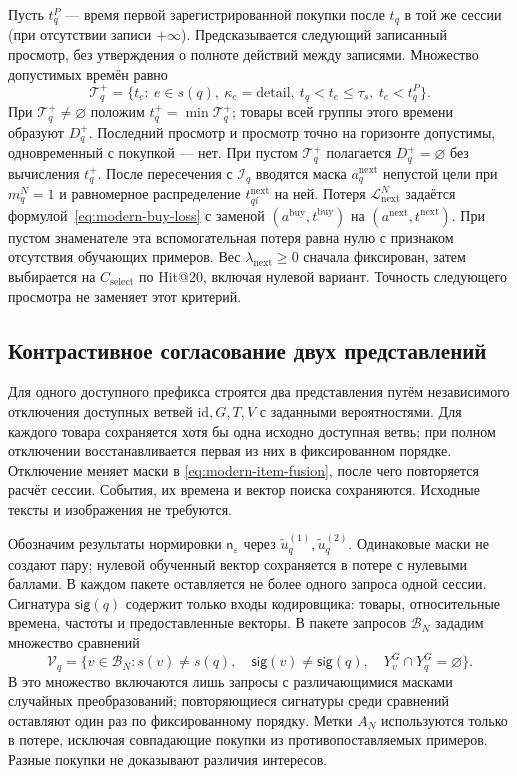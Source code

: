 \documentclass[12pt,a4paper]{article}
\newcommand{\eps}{\varepsilon}
\theoremstyle{plainru}
\begin{document}
Пусть $t_q^P$ --- время первой зарегистрированной покупки после $t_q$
в той же сессии (при отсутствии записи $+\infty$).
Предсказывается следующий записанный просмотр, без утверждения
о полноте действий между записями. Множество допустимых времён равно
\begin{equation}\label{eq:modern-next-time}
\mathcal T_q^+=\{t_e:\ e\in s(q),\ \kappa_e=\mathrm{detail},\
t_q<t_e\le\tau_s,\ t_e<t_q^P\}.
\end{equation}
При $\mathcal T_q^+\ne\varnothing$ положим $t_q^+=\min\mathcal T_q^+$;
товары всей группы этого времени образуют $D_q^+$.
Последний просмотр и просмотр точно на горизонте допустимы,
одновременный с покупкой --- нет. При пустом $\mathcal T_q^+$
полагается $D_q^+=\varnothing$ без вычисления $t_q^+$.
После пересечения с $\mathcal I_q$ вводятся маска
$a_q^{\mathrm{next}}$ непустой цели при $m_q^N=1$ и равномерное распределение
$t_{qi}^{\mathrm{next}}$ на ней.
Потеря $\mathcal L_{\mathrm{next}}^N$ задаётся
формулой~\eqref{eq:modern-buy-loss} с заменой
$(a^{\mathrm{buy}},t^{\mathrm{buy}})$ на
$(a^{\mathrm{next}},t^{\mathrm{next}})$.
При пустом знаменателе эта вспомогательная потеря равна нулю
с признаком отсутствия обучающих примеров.
Вес $\lambda_{\mathrm{next}}\ge0$ сначала фиксирован,
затем выбирается на $C_{\mathrm{select}}$ по Hit@20, включая нулевой вариант.
Точность следующего просмотра не заменяет этот критерий.

\subsection{Контрастивное согласование двух представлений}
\label{sec:modern-contrastive}

Для одного доступного префикса строятся два представления
путём независимого отключения доступных ветвей
$\mathrm{id},G,T,V$ с заданными вероятностями.
Для каждого товара сохраняется хотя бы одна исходно доступная ветвь;
при полном отключении восстанавливается первая из них
в фиксированном порядке. Отключение меняет маски в
\eqref{eq:modern-item-fusion}, после чего повторяется расчёт сессии.
События, их времена и вектор поиска сохраняются.
Исходные тексты и изображения не требуются.

Обозначим результаты нормировки $\mathsf n_\eps$ через
$\tilde u_q^{(1)},\tilde u_q^{(2)}$.
Одинаковые маски не создают пару; нулевой обученный вектор
сохраняется в потере с нулевыми баллами.
В каждом пакете оставляется не более одного запроса одной сессии.
Сигнатура $\mathsf{sig}(q)$ содержит только входы кодировщика:
товары, относительные времена, частоты и предоставленные векторы.
В пакете запросов $\mathcal B_N$ зададим множество сравнений
\begin{equation}\label{eq:modern-contrastive-negative}
\mathcal V_q=\{v\in\mathcal B_N:
s(v)\ne s(q),\quad \mathsf{sig}(v)\ne\mathsf{sig}(q),\quad
Y_v^G\cap Y_q^G=\varnothing\}.
\end{equation}
В это множество включаются лишь запросы с различающимися масками
случайных преобразований; повторяющиеся сигнатуры среди сравнений
оставляют один раз по фиксированному порядку.
Метки $A_N$ используются только в потере, исключая совпадающие покупки
из противопоставляемых примеров. Разные покупки не доказывают
различия интересов.
\end{document}
